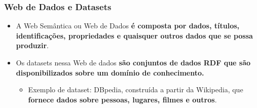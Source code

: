 \documentclass[hyperref={pdfpagelabels=false}]{beamer}
\begin{document}
\begin{frame}
\frametitle{Web de Dados e Datasets}
\begin{itemize}
  \item{A Web Semântica ou Web de Dados \textbf{é composta por dados, títulos, identificações, propriedades e quaisquer outros dados que se possa produzir}.}
  \item Os datasets nessa Web de dados \textbf{são conjuntos de dados RDF que são disponibilizados sobre um domínio  de conhecimento.}
  \begin{itemize}
  \item Exemplo de dataset: DBpedia, construída a partir da Wikipedia, que \textbf{fornece dados sobre pessoas, lugares, filmes e outros}. 
  \end{itemize}
\end{itemize}
\end{frame}






\end{document}
